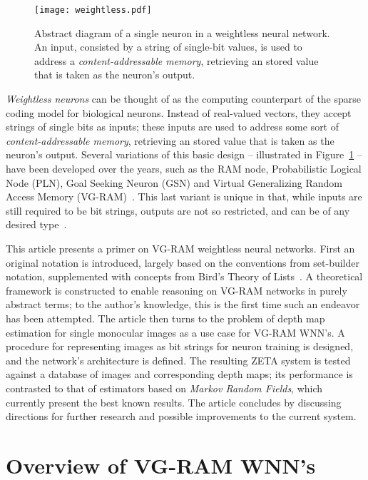 \documentclass[twocolumn, 9pt]{jsproceedings}
\begin{document}
\begin{figure}[h!]
\texttt{[image: weightless.pdf]}
\caption{Abstract diagram of a single neuron in a weightless neural network. An input, consisted by a string of single-bit values, is used to address a {\it content-addressable memory}, retrieving an stored value that is taken as the neuron's output.}
\label{fig:weightless}
\end{figure}

{\it Weightless neurons} can be thought of as the computing counterpart of the sparse coding model for biological neurons. Instead of real-valued vectors, they accept strings of single bits as inputs; these inputs are used to address some sort of {\it content-addressable memory}, retrieving an stored value that is taken as the neuron's output. Several variations of this basic design -- illustrated in Figure~\ref{fig:weightless} -- have been developed over the years, such as the RAM node, Probabilistic Logical Node (PLN), Goal Seeking Neuron (GSN) and Virtual Generalizing Random Access Memory (VG-RAM)~\cite{ludermir98}. This last variant is unique in that, while inputs are still required to be bit strings, outputs are not so restricted, and can be of any desired type~\cite{souza08}.

This article presents a primer on VG-RAM weightless neural networks. First an original notation is introduced, largely based on the conventions from set-builder notation, supplemented with concepts from Bird's Theory of Lists~\cite{bird87}. A theoretical framework is constructed to enable reasoning on VG-RAM networks in purely abstract terms; to the author's knowledge, this is the first time such an endeavor has been attempted. The article then turns to the problem of depth map estimation for single monocular images as a use case for VG-RAM WNN's. A procedure for representing images as bit strings for neuron training is designed, and the network's architecture is defined. The resulting ZETA system is tested against a database of images and corresponding depth maps; its performance is contrasted to that of estimators based on {\it Markov Random Fields}, which currently present the best known results. The article concludes by discussing directions for further research and possible improvements to the current system.

\section{Overview of VG-RAM WNN's}
\end{document}
